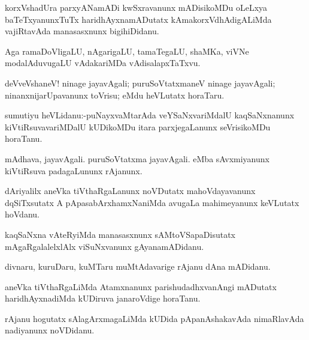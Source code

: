 \documentclass{article}
\begin{document}
\begin{mn}%
korxVshadUra parxyANamADi kwSxravanunx mADisikoMDu oLeLxya baTeTxyanunxTuTx 
haridhAyxnamADutatx kAmakorxVdhAdigALiMda vajiRtavAda manasasxnunx bigihiDidanu.
\end{mn}

\begin{mn}%
Aga ramaDoVligaLU, nAgarigaLU, tamaTegaLU, shaMKa, viVNe modalAduvugaLU vAdakariMDa 
vAdisalapxTaTxvu.
\end{mn}

\begin{mn}%
deVveVshaneV! ninage jayavAgali; puruSoVtatxmaneV ninage jayavAgali; ninanxnijarUpavanunx 
toVrisu; eMdu heVLutatx horaTaru.
\end{mn}


\begin{mn}%
sumutiyu heVLidanu:-puNayxvaMtarAda veYSaNxvariMdalU kaqSaNxnanunx kiVtiRsuvavariMDalU 
kUDikoMDu itara parxjegaLanunx seVrisikoMDu horaTanu.
\end{mn}

\begin{mn}%
mAdhava, jayavAgali. puruSoVtatxma jayavAgali. eMba sAvxmiyanunx kiVtiRsuva padagaLununx
rAjanunx.  
\end{mn}

\begin{mn}%
dAriyalilx aneVka tiVthaRgaLanunx noVDutatx mahoVdayavanunx dqSiTxsutatx A 
pApasabArxhamxNaniMda avugaLa mahimeyanunx keVLutatx hoVdanu.
\end{mn}

\begin{mn}%
kaqSaNxna vAteRyiMda manasasxnunx sAMtoVSapaDisutatx mAgaRgalalelxlAlx viSuNxvanunx 
gAyanamADidanu.
\end{mn}

\begin{mn}%
divnaru, kuruDaru, kuMTaru muMtAdavarige rAjanu dAna mADidanu.
\end{mn}

\begin{mn}%
aneVka tiVthaRgaLiMda Atamxnanunx parishudadhxvanAngi mADutatx haridhAyxnadiMda kUDiruva 
janaroVdige horaTanu.
\end{mn}

\begin{mn}%
rAjanu hogutatx sAlagArxmagaLiMda kUDida pApanAshakavAda nimaRlavAda nadiyanunx noVDidanu.
\end{mn}
\end{document}
